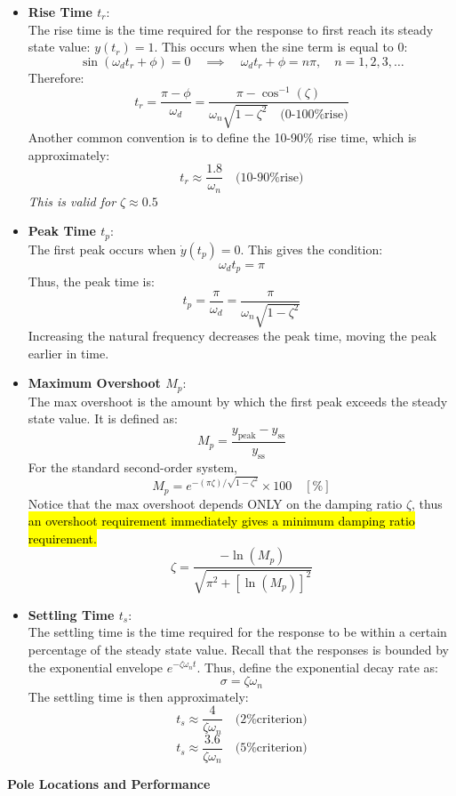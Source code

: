 ﻿\documentclass[12pt]{article}
\begin{document}
\begin{itemize}
    \item \textbf{Rise Time \(t_r\)}:\\
    The rise time is the time required for the response to first reach its steady state value: $y(t_r) = 1$. This occurs when the sine term is equal to $0$:
    \[\sin(\omega_d t_r + \phi) = 0\quad \implies \quad \omega_d t_r + \phi = n\pi, \quad n=1,2,3,\ldots\]
    Therefore:
    \[\boxed{t_r = \frac{\pi -\phi}{\omega_d}=\frac{\pi-\cos^{-1}(\zeta)}{\omega_n\sqrt{1-\zeta^2}\quad\text{(0-100\% rise)}}}\]
    Another common convention is to define the 10-90\% rise time, which is approximately:
    \[\boxed{t_r \approx \frac{1.8}{\omega_n}\quad\text{(10-90\% rise)}}\]
    \textit{This is valid for $\zeta \approx 0.5$}
    \item \textbf{Peak Time \(t_p\)}:\\
    The first peak occurs when $\dot{y}(t_p) = 0$. This gives the condition:
    \[\omega_d t_p = \pi\]
    Thus, the peak time is:
    \[\boxed{t_p = \frac{\pi}{\omega_d} = \frac{\pi}{\omega_n\sqrt{1-\zeta^2}}}\]
    Increasing the natural frequency decreases the peak time, moving the peak earlier in time.
    \item \textbf{Maximum Overshoot \(M_p\)}:\\
    The max overshoot is the amount by which the first peak exceeds the steady state value. It is defined as:
    \[M_p = \frac{y_\text{peak} - y_{\text{ss}}}{y_{\text{ss}}}\]
    For the standard second-order system, 
    \[\boxed{M_p = e^{-(\pi\zeta)/\sqrt{1-\zeta^2}}\times 100 \quad [\%]}\]
    Notice that the max overshoot depends ONLY on the damping ratio $\zeta$, thus \hl{an overshoot requirement immediately gives a minimum damping ratio requirement.}
    \[\boxed{\zeta = \frac{-\ln(M_p)}{\sqrt{\pi^2 +[\ln(M_p)]^2 }}}\]
    \item \textbf{Settling Time \(t_s\)}:\\
    The settling time is the time required for the response to be within a certain percentage of the steady state value. Recall that the responses is bounded by the exponential envelope $e^{-\zeta\omega_n t}$. Thus, define the exponential decay rate as:
    \[\boxed{\sigma = \zeta\omega_n}\]
    The settling time is then approximately:
    \[\boxed{t_s \approx \frac{4}{\zeta\omega_n}\quad\text{(2\% criterion)}}\]
    \[\boxed{t_s \approx \frac{3.6}{\zeta\omega_n}\quad\text{(5\% criterion)}}\]
\end{itemize}
\newpage
\textbf{Pole Locations and Performance}\\
\end{document}
